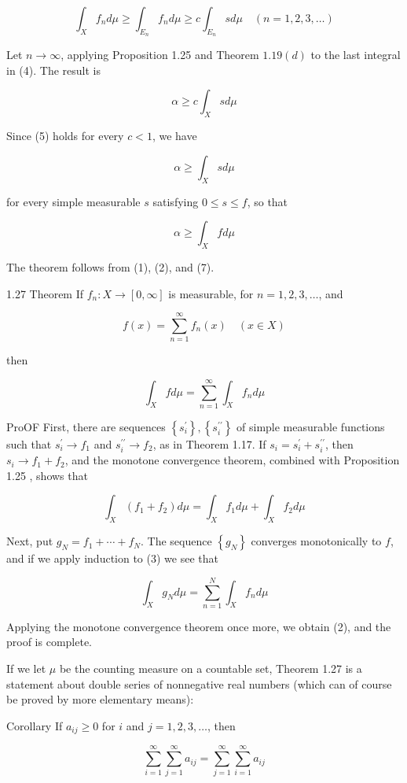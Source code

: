 \documentclass[10pt]{article}
\begin{document}
$$
\int_{X} f_{n} d \mu \geq \int_{E_{n}} f_{n} d \mu \geq c \int_{E_{n}} s d \mu \quad(n=1,2,3, \ldots)
$$

Let $n \rightarrow \infty$, applying Proposition 1.25 and Theorem $1.19(d)$ to the last integral in (4). The result is

$$
\alpha \geq c \int_{X} s d \mu
$$

Since (5) holds for every $c<1$, we have

$$
\alpha \geq \int_{X} s d \mu
$$

for every simple measurable $s$ satisfying $0 \leq s \leq f$, so that

$$
\alpha \geq \int_{X} f d \mu
$$

The theorem follows from (1), (2), and (7).

1.27 Theorem If $f_{n}: X \rightarrow[0, \infty]$ is measurable, for $n=1,2,3, \ldots$, and

$$
f(x)=\sum_{n=1}^{\infty} f_{n}(x) \quad(x \in X)
$$

then

$$
\int_{X} f d \mu=\sum_{n=1}^{\infty} \int_{X} f_{n} d \mu
$$

ProOF First, there are sequences $\left\{s_{i}^{\prime}\right\},\left\{s_{i}^{\prime \prime}\right\}$ of simple measurable functions such that $s_{i}^{\prime} \rightarrow f_{1}$ and $s_{i}^{\prime \prime} \rightarrow f_{2}$, as in Theorem 1.17. If $s_{i}=s_{i}^{\prime}+s_{i}^{\prime \prime}$, then $s_{i} \rightarrow f_{1}+f_{2}$, and the monotone convergence theorem, combined with Proposition 1.25 , shows that

$$
\int_{X}\left(f_{1}+f_{2}\right) d \mu=\int_{X} f_{1} d \mu+\int_{X} f_{2} d \mu
$$

Next, put $g_{N}=f_{1}+\cdots+f_{N}$. The sequence $\left\{g_{N}\right\}$ converges monotonically to $f$, and if we apply induction to (3) we see that

$$
\int_{X} g_{N} d \mu=\sum_{n=1}^{N} \int_{X} f_{n} d \mu
$$

Applying the monotone convergence theorem once more, we obtain (2), and the proof is complete.

If we let $\mu$ be the counting measure on a countable set, Theorem 1.27 is a statement about double series of nonnegative real numbers (which can of course be proved by more elementary means):

Corollary If $a_{i j} \geq 0$ for $i$ and $j=1,2,3, \ldots$, then

$$
\sum_{i=1}^{\infty} \sum_{j=1}^{\infty} a_{i j}=\sum_{j=1}^{\infty} \sum_{i=1}^{\infty} a_{i j}
$$
\end{document}
